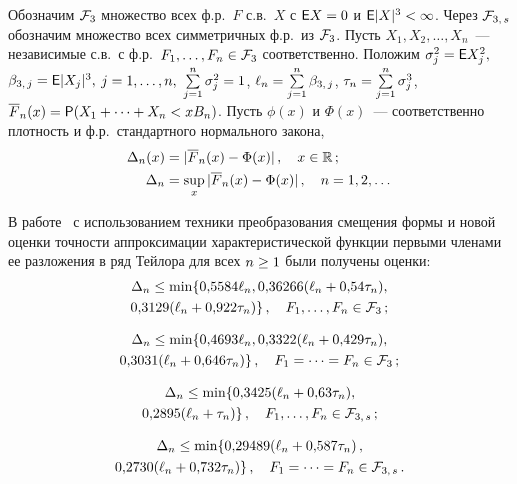       \thispagestyle{headings}

      \begin{multicols}{2}

            \label{st\stat}


Обозначим ${\mathcal F}_3$ множество всех ф.р.~$F$
с.в.~$X$ с ${\e X\hm=0}$ и ${\e|X|^3\hm< \infty}$.
Через ${\mathcal F}_{3,\,s}$ обозначим множество всех симметричных ф.р.\ из
${\mathcal F}_3$. Пусть $X_1,X_2,\ldots,X_n$~--- независимые с.в.\ с ф.р.\
$F_1,\ldots,F_n\in{\mathcal F}_3$ соответственно. Положим $\sigma_j^2\hm= \e
X_j^2,$ $\beta_{3,\,j}\hm=\e|X_j|^3,$ $j\hm=1,\ldots,n,$
$\sum\limits_{j=1}^n\sigma_j^2\hm=1$, $\ell_n\hm=\sum\limits_{j=1}^n\beta_{3,\,j}$,
$\tau_n\hm=\sum\limits_{j=1}^n\sigma_j^3$,
$\overline F_n(x)\hm=\p(X_1+\cdots+X_n\hm<xB_n)$. Пусть $\phi(x)$ и
$\Phi(x)$~--- соответственно плотность и ф.р.\ стандартного
нормального закона,
\begin{align*}
\Delta_n(x)&=|\overline F_n(x)-\Phi(x)|\,,\quad x\in\mathbb R\,;\\
\Delta_n &=\sup\limits_x|\overline F_n(x)-\Phi(x)|\,,\quad n=1,2,\ldots\,
\end{align*}

В работе~\cite{Shevtsova2012ISSPSM3} с использованием техники
преобразования смещения формы и новой оценки точности аппроксимации
характеристической функции первыми членами ее разложения в ряд
Тейлора для всех $n\hm\ge1$ были получены оценки:
\begin{multline*}
\Delta_n\le \min\{0{,}5584\ell_n, 0{,}36266(\ell_n+0{,}54\tau_n),\\
0{,}3129(\ell_n+0{,}922\tau_n)\}\,,\quad F_1,\ldots,F_n\in{\mathcal F}_3\,;
\end{multline*}


\noindent
\begin{multline*}
\Delta_n\le \min\{ 0{,}4693\ell_n, 0{,}3322(\ell_n+0{,}429\tau_n),\\
0{,}3031(\ell_n+0{,}646\tau_n)\}\,,\quad  F_1=\cdots=F_n\in{\mathcal F}_3\,;
\end{multline*}

\vspace*{-9pt}

\noindent
\begin{multline*}
\Delta_n\le \min\{ 0{,}3425(\ell_n+0{,}63\tau_n),\\
0{,}2895(\ell_n+\tau_n) \}\,,\quad  F_1,\ldots,F_n\in{\mathcal F}_{3,\,s}\,;
\end{multline*}

\vspace*{-9pt}

\noindent
\begin{multline*}
\Delta_n\le \min\{ 0{,}29489(\ell_n+0{,}587\tau_n)\,,\\
0{,}2730(\ell_n+0{,}732\tau_n)\}\,, \quad F_1=\cdots=F_n\in{\mathcal F}_{3,\,s}\,.
\end{multline*}


\end{multicols}
